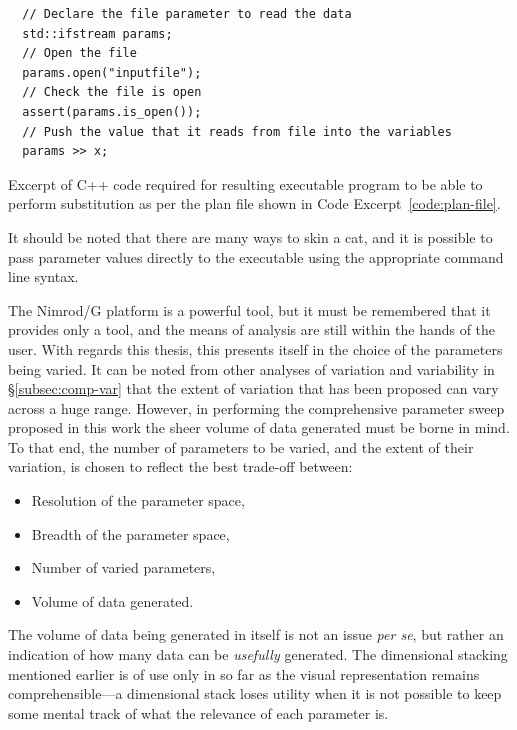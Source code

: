 \documentclass[../thesis-main.tex]{subfiles}
\begin{document}
\begin{listing}[tb]
 \begin{verbatim}
  // Declare the file parameter to read the data
  std::ifstream params;
  // Open the file
  params.open("inputfile");
  // Check the file is open
  assert(params.is_open());
  // Push the value that it reads from file into the variables
  params >> x;
 \end{verbatim}
 \caption[Nimrod/G code: Parameter Substitution]{Excerpt of C++ code required for resulting executable program to be able to perform substitution as per the plan file shown in Code Excerpt~\ref{code:plan-file}.}
 \label{code:c++-code}
\end{listing}

It should be noted that there are many ways to skin a cat, and it is possible to pass parameter values directly to the executable using the appropriate command line syntax.

The Nimrod/G platform is a powerful tool, but it must be remembered that it provides only a tool, and the means of analysis are still within the hands of the user. With regards this thesis, this presents itself in the choice of the parameters being varied. It can be noted from other analyses of variation and variability in \S\ref{subsec:comp-var} that the extent of variation that has been proposed can vary across a huge range. However, in performing the comprehensive parameter sweep proposed in this work the sheer volume of data generated must be borne in mind. To that end, the number of parameters to be varied, and the extent of their variation, is chosen to reflect the best trade-off between:
\begin{itemize}
 \item Resolution of the parameter space,
 \item Breadth of the parameter space,
 \item Number of varied parameters,
 \item Volume of data generated.
\end{itemize}
The volume of data being generated in itself is not an issue \emph{per se}, but rather an indication of how many data can be \emph{usefully} generated. The dimensional stacking mentioned earlier is of use only in so far as the visual representation remains comprehensible---a dimensional stack loses utility when it is not possible to keep some mental track of what the relevance of each parameter is.

\end{document}
